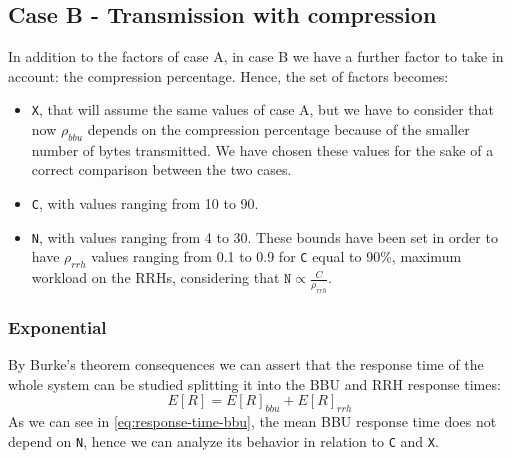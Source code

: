 \documentclass[11pt,a4paper,oneside, openright]{article}
\begin{document}
\subsection{Case B - Transmission with compression}
In addition to the factors of case A, in case B we have a further factor to take in account: the compression percentage. Hence, the set of factors becomes:

\begin{itemize}
	\item \texttt{X}, that will assume the same values of case A, but we have to consider that now $ \rho_{bbu} $ depends on the compression percentage because of the smaller number of bytes transmitted. We have chosen these values for the sake of a correct comparison between the two cases.
	\item \texttt{C}, with values ranging from 10 to 90. 
	\item \texttt{N}, with values ranging from 4 to 30. These bounds have been set in order to have $\rho_{rrh}$ values ranging from 0.1 to 0.9 for \texttt{C} equal to 90\%, maximum workload on the RRHs, considering that $\texttt{N} \propto \frac{C}{\rho_{rrh}}$.	
\end{itemize}


\subsubsection{Exponential}
By Burke's theorem consequences we can assert that the response time of the whole system can be studied splitting it into the BBU and RRH response times:
\begin{equation}
E[R] = E[R]_{bbu} + E[R]_{rrh}
\end{equation} 
As we can see in \ref{eq:response-time-bbu}, the mean BBU response time does not depend on \texttt{N}, hence we can analyze its behavior in relation to \texttt{C} and \texttt{X}.
\end{document}
